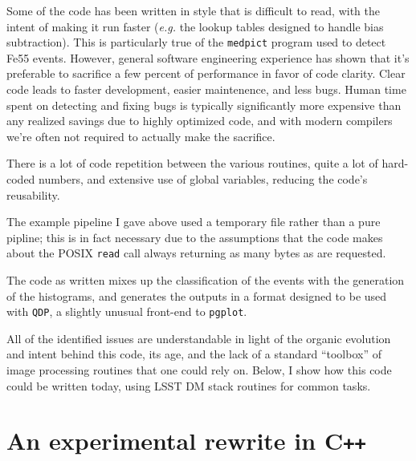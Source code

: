 \documentclass[12pt]{article}
\newcommand{\CPP}{C\texttt{++}\xspace}  %
\begin{document}
Some of the code has been written in style that is difficult to read, with the intent of
making it run faster (\textit{e.g.} the lookup tables designed to handle bias
subtraction). This is particularly true of the \texttt{medpict} program used to
detect Fe55 events. However, general software engineering experience has shown that it's
preferable to sacrifice a few percent of performance in favor of code clarity. Clear code
leads to faster development, easier maintenence, and less bugs. Human time
spent on detecting and fixing bugs is typically significantly more expensive than any 
realized savings due to highly optimized code, and with modern compilers we're often not
required to actually make the sacrifice. 

There is a lot of code repetition between the various routines, quite a lot of hard-coded numbers, and
extensive use of global variables, reducing the code's reusability.

The example pipeline I gave above used a temporary file rather than a pure pipline; this is in fact necessary
due to the assumptions that the code makes about the POSIX \texttt{read} call always returning as many bytes
as are requested.

The code as written mixes up the classification of the events with the generation of the histograms, and
generates the outputs in a format designed to be used
with \texttt{QDP}, a slightly unusual front-end to \texttt{pgplot}.

All of the identified issues are understandable in light of the organic
evolution and intent behind this code, its age, and the lack of a standard
``toolbox'' of image processing routines that one could rely on.  Below, I
show how this code could be written today, using LSST DM stack routines for
common tasks.

\section{An experimental rewrite in \CPP}
\end{document}
